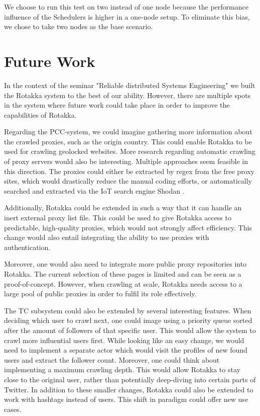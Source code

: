 \documentclass{sigchi}
\begin{document}
We choose to run this test on two instead of one node because the performance influence of the Schedulers is higher in a one-node setup. To eliminate this bias, we chose to take two nodes as the base scenario.


\section{Future Work}

In the context of the seminar "Reliable distributed Systems Engineering" we built the Rotakka system to the best of our ability. However, there are multiple spots in the system where future work could take place in order to improve the capabilities of Rotakka.

Regarding the PCC-system, we could imagine gathering more information about the crawled proxies, such as the origin country. This could enable Rotakka to be used for crawling geolocked websites. More research regarding automatic crawling of proxy servers would also be interesting. Multiple approaches seem feasible in this direction. The proxies could either be extracted by regex from the free proxy sites, which would drastically reduce the manual coding efforts, or automatically searched and extracted via the IoT search engine Shodan \cite{shodan:homepage}.

Additionally, Rotakka could be extended in such a way that it can handle an inert external proxy list file. This could be used to give Rotakka access to predictable, high-quality proxies, which would not strongly affect efficiency. This change would also entail integrating the ability to use proxies with authentication.

Moreover, one would also need to integrate more public proxy repositories into Rotakka. The current selection of these pages is limited and can be seen as a proof-of-concept. However, when crawling at scale, Rotakka needs access to a large pool of public proxies in order to fulfil its role effectively.

The TC subsystem could also be extended by several interesting features. When deciding which user to crawl next, one could image using a priority queue sorted after the amount of followers of that specific user. This would allow the system to crawl more influential users first. While looking like an easy change, we would need to implement a separate actor which would visit the profiles of new found users and extract the follower count. 
Moreover, one could think about implementing a maximum crawling depth. This would allow Rotakka to stay close to the original user, rather than potentially deep-diving into certain parts of Twitter. 
In addition to these smaller changes, Rotakka could also be extended to work with hashtags instead of users. This shift in paradigm could offer new use cases.
\end{document}
